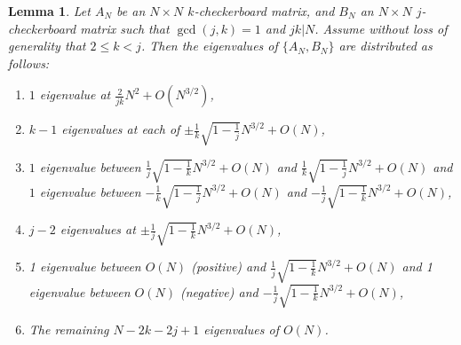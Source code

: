\documentclass[11pt,reqno]{amsart}
\numberwithin{equation}{section}
\theoremstyle{plain}
\newtheorem{lemma}[thm]{Lemma}
\begin{document}
\begin{lemma}\label{multipleregimeskjcheckerboard}
Let $A_N$ be an $N\times N$ $k$-checkerboard matrix, and $B_N$ an $N\times N$ $j$-checkerboard matrix such that $\gcd(j,k)=1$ and $jk|N$. Assume without loss of generality that $2\leq k<j$. Then the eigenvalues of $\{A_N,B_N\}$ are distributed as follows: 
\begin{enumerate}
\item $1$ eigenvalue at $\frac{2}{jk}N^2+O(N^{3/2})$,
\item $k-1$ eigenvalues at each of $\pm \frac{1}{k}\sqrt{1-\frac{1}{j}}N^{3/2}+O(N)$,
\item $1$ eigenvalue between $\frac{1}{j}\sqrt{1-\frac{1}{k}}N^{3/2}+O(N)$ and $\frac{1}{k}\sqrt{1-\frac{1}{j}}N^{3/2}+O(N)$ and $1$ eigenvalue between $-\frac{1}{k}\sqrt{1-\frac{1}{j}}N^{3/2}+O(N)$ and $-\frac{1}{j}\sqrt{1-\frac{1}{k}}N^{3/2}+O(N)$,
\item $j-2$ eigenvalues at $\pm \frac{1}{j}\sqrt{1-\frac{1}{k}}N^{3/2}+O(N)$,
\item 1 eigenvalue between $O(N)$ (positive) and $\frac{1}{j}\sqrt{1-\frac{1}{k}}N^{3/2}+O(N)$ and 1 eigenvalue between $O(N)$ (negative) and $-\frac{1}{j}\sqrt{1-\frac{1}{k}}N^{3/2}+O(N)$,
\item The remaining $N-2k-2j+1$ eigenvalues of $O(N)$.
\end{enumerate}
\end{lemma}
\end{document}

